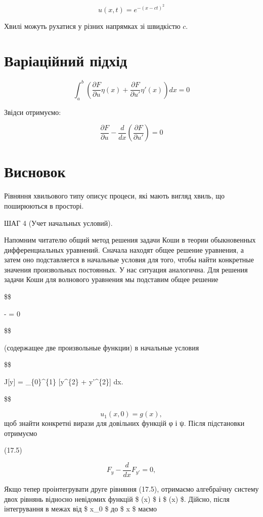 \documentclass[
  ukrainian,
]{article}
\begin{document}
\[
u(x,t) = e^{-(x - ct)^2}
\]

Хвилі можуть рухатися у різних напрямках зі швидкістю \(c\).

\section{Варіаційний
підхід}\label{ux432ux430ux440ux456ux430ux446ux456ux439ux43dux438ux439-ux43fux456ux434ux445ux456ux434}

\[
\int_a^b \left( \frac{\partial F}{\partial u} \eta(x) + \frac{\partial F}{\partial u'} \eta'(x) \right) dx = 0
\]

Звідси отримуємо:

\[
\frac{\partial F}{\partial u} - \frac{d}{dx}\left( \frac{\partial F}{\partial u'} \right) = 0
\]

\section{Висновок}\label{ux432ux438ux441ux43dux43eux432ux43eux43a-1}

Рівняння хвильового типу описує процеси, які мають вигляд хвиль, що
поширюються в просторі.

ШАГ 4 (Учет начальных условий).

Напомним читателю общий метод решения задачи Коши в теории обыкновенных
дифференциальных уравнений. Сначала находят общее решение уравнения, а
затем оно подставляется в начальные условия для того, чтобы найти
конкретные значения произвольных постоянных. У нас ситуация аналогична.
Для решения задачи Коши для волнового уравнения мы подставим общее
решение

\$\$

 - 
 = 0

\$\$

(содержащее две произвольные функции) в начальные условия

\$\$

J{[}y{]} = \int\_\{0\}\^{}\{1\} {[}y\^{}\{2\} + y'\^{}\{2\}{]} dx.

\$\$

\[ u_1(x, 0) = g(x), \] щоб знайти конкретні вирази для довільних
функцій φ і ψ. Після підстановки отримуємо

(17.5)

\[
F_y - \frac{d}{dx} F_{y'} = 0,
\]

Якщо тепер проінтегрувати друге рівняння (17.5), отримаємо алгебраїчну
систему двох рівнянь відносно невідомих функцій \$ \varphi(x) \$ і \$
\psi(x) \$. Дійсно, після інтегрування в межах від \$ x\_0 \$ до \$ x \$
маємо
\end{document}

